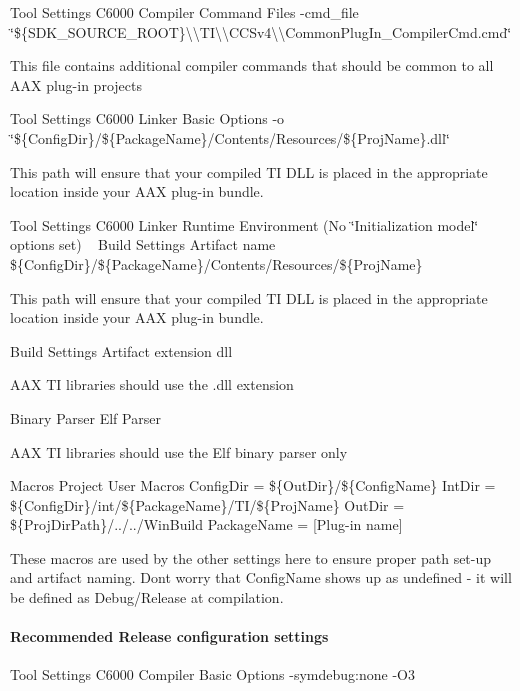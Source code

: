  Tool Settings   C6000 Compiler   Command Files   {\ttfamily -\/cmd\+\_\+file \char`\"{}\$\{\+S\+D\+K\+\_\+\+S\+O\+U\+R\+C\+E\+\_\+\+R\+O\+O\+T\}\textbackslash{}\textbackslash{}\+T\+I\textbackslash{}\textbackslash{}\+C\+C\+Sv4\textbackslash{}\textbackslash{}\+Common\+Plug\+In\+\_\+\+Compiler\+Cmd.\+cmd\char`\"{}}

This file contains additional compiler commands that should be common to all A\+A\+X plug-\/in projects

 Tool Settings   C6000 Linker   Basic Options   {\ttfamily -\/o \char`\"{}\$\{\+Config\+Dir\}/\$\{\+Package\+Name\}/\+Contents/\+Resources/\$\{\+Proj\+Name\}.\+dll\char`\"{}}

This path will ensure that your compiled T\+I D\+L\+L is placed in the appropriate location inside your A\+A\+X plug-\/in bundle.

 Tool Settings   C6000 Linker   Runtime Environment   (No \char`\"{}\+Initialization model\char`\"{} options set) ~\newline
  Build Settings   Artifact name   {\ttfamily \$\{Config\+Dir\}/\$\{Package\+Name\}/\+Contents/\+Resources/\$\{Proj\+Name\}}

This path will ensure that your compiled T\+I D\+L\+L is placed in the appropriate location inside your A\+A\+X plug-\/in bundle.

 Build Settings   Artifact extension   {\ttfamily dll}

A\+A\+X T\+I libraries should use the .dll extension

 Binary Parser   Elf Parser

A\+A\+X T\+I libraries should use the Elf binary parser only

 Macros   Project   User Macros   Config\+Dir = {\ttfamily \$\{Out\+Dir\}/\$\{Config\+Name\}}  Int\+Dir = {\ttfamily \$\{Config\+Dir\}/int/\$\{Package\+Name\}/\+T\+I/\$\{Proj\+Name\}}  Out\+Dir = {\ttfamily \$\{Proj\+Dir\+Path\}/../../\+Win\+Build}  Package\+Name = \mbox{[}Plug-\/in name\mbox{]}

These macros are used by the other settings here to ensure proper path set-\/up and artifact naming. Don\textquotesingle{}t worry that {\ttfamily Config\+Name} shows up as undefined -\/ it will be defined as Debug/\+Release at compilation.

\hypertarget{a00362_subsubsection__recommended_release_configuration_settings_}{}\paragraph{Recommended Release configuration settings}\label{a00362_subsubsection__recommended_release_configuration_settings_}
  Tool Settings   C6000 Compiler   Basic Options   {\ttfamily -\/symdebug\+:none}  {\ttfamily -\/\+O3}

